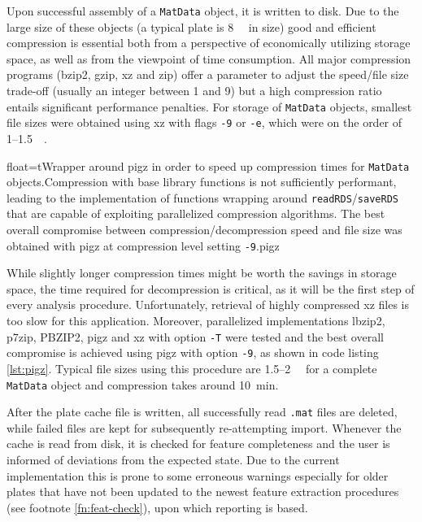 Upon successful assembly of a \texttt{MatData} object, it is written to disk. Due to the large size of these objects (a typical plate is \tilde \SI{8}{\giga\byte} in size) good and efficient compression is essential both from a perspective of economically utilizing storage space, as well as from the viewpoint of time consumption. All major compression programs (bzip2, gzip, xz and zip) offer a parameter to adjust the speed\slash file size trade-off (usually an integer between 1 and 9) but a high compression ratio entails significant performance penalties. For storage of \texttt{MatData} objects, smallest file sizes were obtained using xz with flags \texttt{-9} or \texttt{-e}, which were on the order of 1--\SI{1.5}{\giga\byte}.

\begin{rlisting}{float=t}{Wrapper around pigz in order to speed up compression times for \texttt{MatData} objects.}{Compression with base library functions is not sufficiently performant, leading to the implementation of functions wrapping around \texttt{readRDS}\slash\texttt{saveRDS} that are capable of exploiting parallelized compression algorithms. The best overall compromise between compression\slash decompression speed and file size was obtained with pigz at compression level setting \texttt{-9}.}{pigz}

\end{rlisting}

While slightly longer compression times might be worth the savings in storage space, the time required for decompression is critical, as it will be the first step of every analysis procedure. Unfortunately, retrieval of highly compressed xz files is too slow for this application. Moreover, parallelized implementations lbzip2, p7zip, PBZIP2, pigz and xz with option \texttt{-T} were tested and the best overall compromise is achieved using pigz with option \texttt{-9}, as shown in code listing \ref{lst:pigz}. Typical file sizes using this procedure are 1.5--\SI{2}{\giga\byte} for a complete \texttt{MatData} object and compression takes around \SI{10}{\minute}.

After the plate cache file is written, all successfully read \texttt{.mat} files are deleted, while failed files are kept for subsequently re-attempting import. Whenever the cache is read from disk, it is checked for feature completeness and the user is informed of deviations from the expected state. Due to the current implementation this is prone to some erroneous warnings especially for older plates that have not been updated to the newest feature extraction procedures (see footnote \ref{fn:feat-check}), upon which reporting is based.

